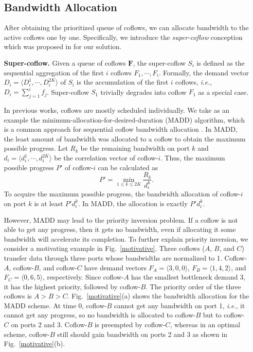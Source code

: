 \documentclass[10pt, conference, letterpaper]{IEEEtran}
\begin{document}
\subsection{Bandwidth Allocation}
After obtaining the prioritized queue of coflows, we can allocate bandwidth to the active coflows one by one. Specifically, we introduce the \emph{super-coflow} conception which was proposed in \cite{utopia} for our solution.

\noindent \textbf{Super-coflow.} Given a queue of coflows $\mathbf{F}$, the super-coflow $S_i$ is defined as the sequential aggregation of the first $i$ coflows $F_1,\cdots,F_i$. Formally, the demand vector $D_i = \langle D_i^1,\cdots,D_i^{2K} \rangle$ of $S_i$ is the accumulation of the first $i$ coflows, \emph{i.e.}, $D_i = \sum_{j=1}^if_j$. Super-coflow $S_1$ trivially degrades into coflow $F_1$ as a special case.

In previous works, coflows are mostly scheduled individually. We take as an example the minimum-allocation-for-desired-duration (MADD) algorithm, which is a common approach for sequential coflow bandwidth allocation \cite{varys, orchestra}. In MADD, the least amount of bandwidth was allocated to a coflow to obtain the maximum possible progress. Let $R_k$ be the remaining bandwidth on port $k$ and $d_i=\langle d_i^1,\cdots,d_i^{2K}\rangle$ be the correlation vector of coflow-$i$. Thus, the maximum possible progress $P'$ of coflow-$i$ can be calculated as
\begin{equation}
	P' = \min_{1\leq k \leq 2K}\frac{R_k}{d_i^k}.
\end{equation}
To acquire the maximum possible progress, the bandwidth allocation of coflow-$i$ on port $k$ is at least $P'd_i^k$. In MADD, the allocation is exactly $P'd_i^k$.

However, MADD may lead to the priority inversion problem. If a coflow is not able to get any progress, then it gets no bandwidth, even if allocating it some bandwidth will accelerate its completion. To further explain priority inversion, we consider a motivating example in Fig.~\ref{motivative}. Three coflows ($A$, $B$, and $C$) transfer data through three ports whose bandwidths are normalized to 1. Coflow-$A$, coflow-$B$, and coflow-$C$ have demand vectors $F_A=\langle 3,0,0\rangle$, $F_B=\langle 1,4,2\rangle$, and $F_C=\langle 0,6,5\rangle$, respectively. Since coflow-$A$ has the smallest bottleneck demand 3, it has the highest priority, followed by coflow-$B$. The priority order of the three coflows is $A > B > C$. Fig.~\ref{motivative}(a) shows the bandwidth allocation for the MADD scheme. At time 0, coflow-$B$ cannot get any bandwidth on port 1, \emph{i.e.}, it cannot get any progress, so no bandwidth is allocated to coflow-$B$ but to coflow-$C$ on ports 2 and 3. Coflow-$B$ is preempted by coflow-$C$, whereas in an optimal scheme, coflow-$B$ still should gain bandwidth on ports 2 and 3 as shown in Fig.~\ref{motivative}(b).
\end{document}
